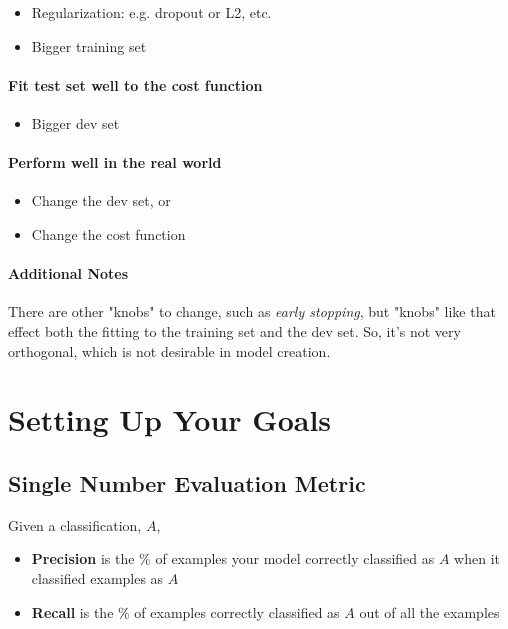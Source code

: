 \documentclass{article}
\begin{document}
\begin{itemize}
\item Regularization: e.g. dropout or L2, etc.
\item Bigger training set
\end{itemize}

\paragraph{Fit test set well to the cost function}

\begin{itemize}
\item Bigger dev set
\end{itemize}

\paragraph{Perform well in the real world}

\begin{itemize}
\item Change the dev set, or
\item Change the cost function
\end{itemize}

\paragraph{Additional Notes}

There are other "knobs" to change, such as \textit{early stopping}, but "knobs" like that effect both the fitting to the training set and the dev set.  So, it's not very orthogonal, which is not desirable in model creation.

\section{Setting Up Your Goals}

\subsection{Single Number Evaluation Metric}

Given a classification, $A$,

\begin{itemize}
\item \textbf{Precision} is the \% of examples your model correctly classified as $A$ when it classified examples as $A$
\item \textbf{Recall} is the \% of examples correctly classified as $A$ out of all the examples
\end{itemize}
\end{document}
